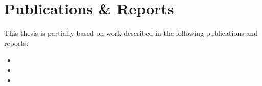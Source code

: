 \section*{Publications \& Reports}
This thesis is partially based on work described in the following publications and reports:
\nobibliography*
\begin{NoHyper} %
\begin{itemize}
    \item {}
    \item {}
    \item {}
\end{itemize}
\end{NoHyper}
\clearpage
